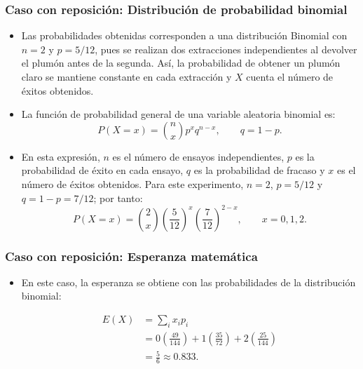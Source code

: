 \documentclass[10pt,letterpaper]{article}
\begin{document}
\subsubsection{Caso con reposición: Distribución de probabilidad binomial}

\begin{itemize}
    \item Las probabilidades obtenidas corresponden a una distribución Binomial con $n=2$ y $p=5/12$, pues se realizan dos extracciones independientes al devolver el plumón antes de la segunda. Así, la probabilidad de obtener un plumón claro se mantiene constante en cada extracción y $X$ cuenta el número de éxitos obtenidos.
    \item La función de probabilidad general de una variable aleatoria binomial es:
    \begin{equation}
        P(X=x)=\binom{n}{x}p^xq^{n-x}, \qquad q=1-p.
    \end{equation}
    \item En esta expresión, $n$ es el número de ensayos independientes, $p$ es la probabilidad de éxito en cada ensayo, $q$ es la probabilidad de fracaso y $x$ es el número de éxitos obtenidos. Para este experimento, $n=2$, $p=5/12$ y $q=1-p=7/12$; por tanto:
    \begin{equation}
        P(X=x)=\binom{2}{x}\left(\frac{5}{12}\right)^x
        \left(\frac{7}{12}\right)^{2-x}, \qquad x=0,1,2.
    \end{equation}
\end{itemize}

\subsubsection{Caso con reposición: Esperanza matemática}
\begin{itemize}
    \item En este caso, la
    esperanza se obtiene con las probabilidades de la distribución binomial:

        \begin{equation}
        \begin{aligned}
        E(X) &= \sum_i x_i p_i \\
            &= 0\left(\frac{49}{144}\right)
            + 1\left(\frac{35}{72}\right)
            + 2\left(\frac{25}{144}\right) \\
            &= \frac{5}{6} \approx 0.833.
        \end{aligned}
        \end{equation}

\end{itemize}
\end{document}
